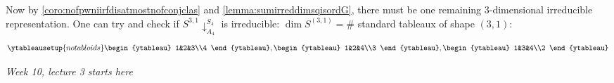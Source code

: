 \documentclass[a4paper]{article}
\theoremstyle{definition}
\begin{document}
Now by \ref{coro:nofpwniirfdisatmostnofconjclas} and \ref{lemma:sumirreddimsqisordG}, there must be one remaining 3-dimensional irreducible representation. One can try and check if $S^{3,1}\downarrow_{A_4}^{S_4}$ is irreducible: $\dim S^{(3,1)}=\# $ standard tableaux of shape $(3,1)$:
\[
\ytableausetup{notabloids}
\begin{ytableau}
1&2&3\\4
\end{ytableau},\begin{ytableau}
1&2&4\\3
\end{ytableau},\begin{ytableau}
1&3&4\\2
\end{ytableau}
\]
\begin{flushright}
\textit{Week 10, lecture 3 starts here}
\end{flushright}
\end{document}
